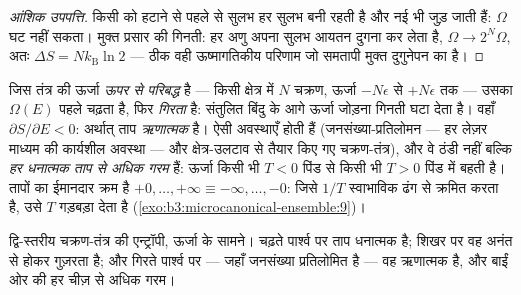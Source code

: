 \begin{proof}[आंशिक उपपत्ति]
किसी  को हटाने से पहले से सुलभ हर 
सुलभ बनी रहती है और नई भी जुड़ जाती हैं: $\Omega$ घट नहीं सकता। मुक्त
प्रसार की गिनती: हर अणु अपना सुलभ आयतन दुगना कर लेता है,
$\Omega \to 2^N\Omega$, अतः $\Delta S = Nk_{\text{B}}\ln2$ ---
ठीक वही ऊष्मागतिकीय परिणाम जो समतापी मुक्त दुगुनेपन का है।
\end{proof}

\begin{example}[ऋणात्मक ताप]\label{ex:b3:microcanonical-ensemble:negative}
जिस तंत्र की ऊर्जा \emph{ऊपर से परिबद्ध} है --- किसी क्षेत्र में $N$
चक्रण, ऊर्जा $-N\epsilon$ से $+N\epsilon$ तक --- उसका $\Omega(E)$
पहले चढ़ता है, फिर \emph{गिरता} है: संतुलित बिंदु के आगे ऊर्जा जोड़ना
गिनती घटा देता है। वहाँ $\partial S/\partial E < 0$: अर्थात् ताप
\emph{ऋणात्मक} है। ऐसी अवस्थाएँ होती हैं (जनसंख्या-प्रतिलोमन --- हर
लेज़र माध्यम की कार्यशील अवस्था --- और क्षेत्र-उलटाव से तैयार किए गए
चक्रण-तंत्र), और वे ठंडी नहीं बल्कि \emph{हर धनात्मक ताप से अधिक गरम}
हैं: ऊर्जा किसी भी $T < 0$ पिंड से किसी भी $T > 0$ पिंड में बहती है।
तापों का ईमानदार क्रम है $+0, \dots, +\infty \equiv -\infty, \dots, -0$:
जिसे $1/T$ स्वाभाविक ढंग से क्रमित करता है, उसे $T$ गड़बड़ा देता है
(\cref{exo:b3:microcanonical-ensemble:9})।
\end{example}

\begin{omfigure}

{\small द्वि-स्तरीय चक्रण-तंत्र की एन्ट्रॉपी, ऊर्जा के सामने। चढ़ते
पार्श्व पर ताप धनात्मक है; शिखर पर वह अनंत से होकर गुज़रता है; और
गिरते पार्श्व पर --- जहाँ जनसंख्या प्रतिलोमित है --- वह ऋणात्मक है,
और बाईं ओर की हर चीज़ से अधिक गरम।}
\end{omfigure}

